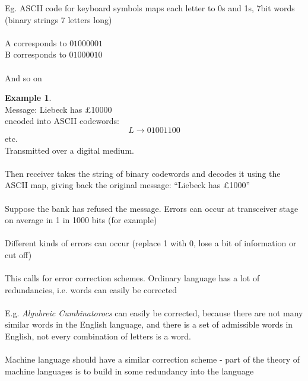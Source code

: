 \documentclass[]{article}
\theoremstyle{definition}
\newtheorem*{exmp}{Example}
\theoremstyle{remark}
\numberwithin{equation}{section}
\begin{document}
	Eg. ASCII code for keyboard symbols maps each letter to 0s and 1s, 7bit words (binary strings 7 letters long)\\
	\\
	A corresponds to $01000001$\\
	B corresponds to $01000010$\\
	\\ And so on\\

	\begin{exmp}\hfill\\
	Message: Liebeck has £10000\\
	encoded into ASCII codewords:\\
	\[
	L \rightarrow 01001100
	\]
	etc.\\

	Transmitted over a digital medium.\\
	\\
	Then receiver takes the string of binary codewords and decodes it using the ASCII map, giving back the original message: “Liebeck has £1000”\\
	\\
	Suppose the bank has refused the message. Errors can occur at transceiver stage on average in 1 in 1000 bits (for example) \\
	\\
	Different kinds of errors can occur (replace 1 with 0, lose a bit of information or cut off) \\
	\\
	This calls for error correction schemes. Ordinary language has a lot of redundancies, i.e. words can easily be corrected \\
	\\
	E.g. \emph{Algubreic Cumbinatorocs} can easily be corrected, because there are not many similar words in the English language, and there is a set of admissible words in English, not every combination of letters is a word.\\
	\\
	Machine language should have a similar correction scheme - part of the theory of machine languages is to build in some redundancy into the language\\
	\end{exmp}
\end{document}
